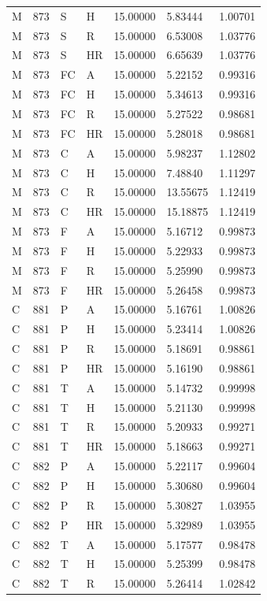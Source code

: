 \begin{longtable}{lllllll}
M & 873 & S & H & 15.00000 & 5.83444 & 1.00701\\
M & 873 & S & R & 15.00000 & 6.53008 & 1.03776\\
M & 873 & S & HR & 15.00000 & 6.65639 & 1.03776\\
M & 873 & FC & A & 15.00000 & 5.22152 & 0.99316\\
M & 873 & FC & H & 15.00000 & 5.34613 & 0.99316\\
M & 873 & FC & R & 15.00000 & 5.27522 & 0.98681\\
M & 873 & FC & HR & 15.00000 & 5.28018 & 0.98681\\
M & 873 & C & A & 15.00000 & 5.98237 & 1.12802\\
M & 873 & C & H & 15.00000 & 7.48840 & 1.11297\\
M & 873 & C & R & 15.00000 & 13.55675 & 1.12419\\
M & 873 & C & HR & 15.00000 & 15.18875 & 1.12419\\
M & 873 & F & A & 15.00000 & 5.16712 & 0.99873\\
M & 873 & F & H & 15.00000 & 5.22933 & 0.99873\\
M & 873 & F & R & 15.00000 & 5.25990 & 0.99873\\
M & 873 & F & HR & 15.00000 & 5.26458 & 0.99873\\
C & 881 & P & A & 15.00000 & 5.16761 & 1.00826\\
C & 881 & P & H & 15.00000 & 5.23414 & 1.00826\\
C & 881 & P & R & 15.00000 & 5.18691 & 0.98861\\
C & 881 & P & HR & 15.00000 & 5.16190 & 0.98861\\
C & 881 & T & A & 15.00000 & 5.14732 & 0.99998\\
C & 881 & T & H & 15.00000 & 5.21130 & 0.99998\\
C & 881 & T & R & 15.00000 & 5.20933 & 0.99271\\
C & 881 & T & HR & 15.00000 & 5.18663 & 0.99271\\
C & 882 & P & A & 15.00000 & 5.22117 & 0.99604\\
C & 882 & P & H & 15.00000 & 5.30680 & 0.99604\\
C & 882 & P & R & 15.00000 & 5.30827 & 1.03955\\
C & 882 & P & HR & 15.00000 & 5.32989 & 1.03955\\
C & 882 & T & A & 15.00000 & 5.17577 & 0.98478\\
C & 882 & T & H & 15.00000 & 5.25399 & 0.98478\\
C & 882 & T & R & 15.00000 & 5.26414 & 1.02842\\

\end{longtable}
